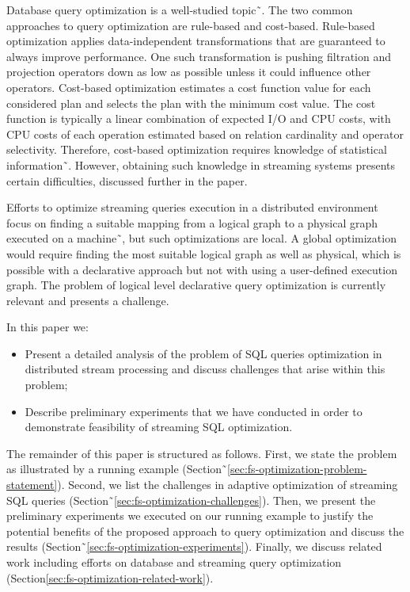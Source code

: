 Database query optimization is a well-studied topic˜\cite{astrahan1976system, haas1989extensible, graefe1993volcano}. 
The two common approaches to query optimization are rule-based and cost-based. 
Rule-based optimization applies data-independent transformations that are guaranteed to always improve performance. One such transformation is pushing filtration and projection operators down as low as possible unless it could influence other operators. 
Cost-based optimization estimates a cost function value for each considered plan and selects the plan with the minimum cost value. The cost function is typically a linear combination of expected I/O and CPU costs, with CPU costs of each operation estimated based on relation cardinality and operator selectivity. Therefore, cost-based optimization requires knowledge of statistical information˜\cite{Neumann2018optimization}. 
However, obtaining such knowledge in streaming systems presents certain difficulties, discussed further in the paper.

Efforts to optimize streaming queries execution in a distributed environment focus on finding a suitable mapping from a logical graph to a physical graph executed on a machine˜\cite{grulich2020grizzly, gedik2009code, kroll2019arc, schneider2012auto, gedik2008spade}, but such optimizations are local.
A global optimization would require finding the most suitable logical graph as well as physical, which is possible with a declarative approach but not with using a user-defined execution graph. 
The problem of logical level declarative query optimization is currently relevant and presents a challenge.


In this paper we:
\begin{itemize}
    \item Present a detailed analysis of the problem of SQL queries optimization in distributed stream processing and discuss challenges that arise within this problem;
    \item Describe preliminary experiments that we have conducted in order to demonstrate feasibility of streaming SQL optimization.
\end{itemize}

The remainder of this paper is structured as follows. First, we state the problem as illustrated by a running example (Section˜\ref{sec:fs-optimization-problem-statement}). 
Second, we list the challenges in adaptive optimization of streaming SQL queries (Section˜\ref{sec:fs-optimization-challenges}). 
Then, we present the preliminary experiments we executed on our running example to justify the potential benefits of the proposed approach to query optimization and discuss the results (Section˜\ref{sec:fs-optimization-experiments}). 
Finally, we discuss related work including efforts on database and streaming query optimization (Section\ref{sec:fs-optimization-related-work}).     
